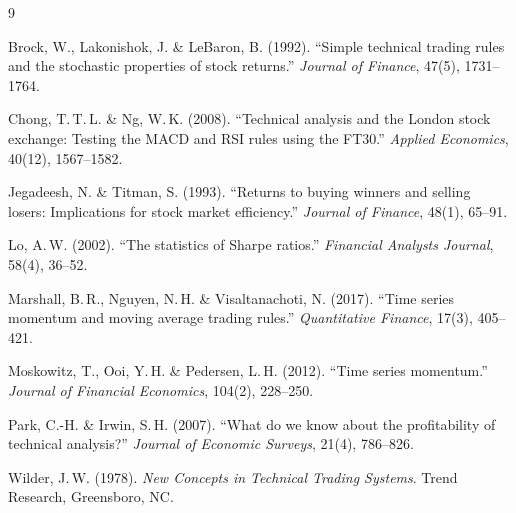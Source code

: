 \documentclass[11pt,a4paper]{article}
\begin{document}
\begin{thebibliography}{9}

Brock, W., Lakonishok, J. \& LeBaron, B. (1992).
``Simple technical trading rules and the stochastic properties of stock
returns.''
\textit{Journal of Finance}, 47(5), 1731--1764.

Chong, T.\,T.\,L. \& Ng, W.\,K. (2008).
``Technical analysis and the London stock exchange: Testing the MACD and RSI
rules using the FT30.''
\textit{Applied Economics}, 40(12), 1567--1582.

Jegadeesh, N. \& Titman, S. (1993).
``Returns to buying winners and selling losers: Implications for stock
market efficiency.''
\textit{Journal of Finance}, 48(1), 65--91.

Lo, A.\,W. (2002).
``The statistics of Sharpe ratios.''
\textit{Financial Analysts Journal}, 58(4), 36--52.

Marshall, B.\,R., Nguyen, N.\,H. \& Visaltanachoti, N. (2017).
``Time series momentum and moving average trading rules.''
\textit{Quantitative Finance}, 17(3), 405--421.

Moskowitz, T., Ooi, Y.\,H. \& Pedersen, L.\,H. (2012).
``Time series momentum.''
\textit{Journal of Financial Economics}, 104(2), 228--250.

Park, C.-H. \& Irwin, S.\,H. (2007).
``What do we know about the profitability of technical analysis?''
\textit{Journal of Economic Surveys}, 21(4), 786--826.

Wilder, J.\,W. (1978).
\textit{New Concepts in Technical Trading Systems}.
Trend Research, Greensboro, NC.

\end{thebibliography}
\end{document}
